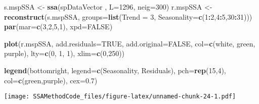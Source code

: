 \documentclass[
]{article}
\newenvironment{Shaded}{\begin{snugshade}}{\end{snugshade}}
\newcommand{\AttributeTok}[1]{\textcolor[rgb]{0.13,0.29,0.53}{#1}}
\newcommand{\ConstantTok}[1]{\textcolor[rgb]{0.56,0.35,0.01}{#1}}
\newcommand{\DecValTok}[1]{\textcolor[rgb]{0.00,0.00,0.81}{#1}}
\newcommand{\FloatTok}[1]{\textcolor[rgb]{0.00,0.00,0.81}{#1}}
\newcommand{\FunctionTok}[1]{\textcolor[rgb]{0.13,0.29,0.53}{\textbf{#1}}}
\newcommand{\NormalTok}[1]{#1}
\newcommand{\OtherTok}[1]{\textcolor[rgb]{0.56,0.35,0.01}{#1}}
\newcommand{\SpecialCharTok}[1]{\textcolor[rgb]{0.81,0.36,0.00}{\textbf{#1}}}
\newcommand{\StringTok}[1]{\textcolor[rgb]{0.31,0.60,0.02}{#1}}
\begin{document}
\begin{Shaded}
\begin{Highlighting}[]
\NormalTok{s.mspSSA }\OtherTok{\textless{}{-}} \FunctionTok{ssa}\NormalTok{(spDataVector , }\AttributeTok{L=}\DecValTok{1296}\NormalTok{, }\AttributeTok{neig=}\DecValTok{300}\NormalTok{)}
\NormalTok{r.mspSSA }\OtherTok{\textless{}{-}} \FunctionTok{reconstruct}\NormalTok{(s.mspSSA, }\AttributeTok{groups=}\FunctionTok{list}\NormalTok{(}\AttributeTok{Trend =} \DecValTok{3}\NormalTok{, }\AttributeTok{Seasonality=}\FunctionTok{c}\NormalTok{(}\DecValTok{1}\SpecialCharTok{:}\DecValTok{2}\NormalTok{,}\DecValTok{4}\SpecialCharTok{:}\DecValTok{5}\NormalTok{,}\DecValTok{30}\SpecialCharTok{:}\DecValTok{31}\NormalTok{)))}
\FunctionTok{par}\NormalTok{(}\AttributeTok{mar=}\FunctionTok{c}\NormalTok{(}\DecValTok{3}\NormalTok{,}\DecValTok{2}\NormalTok{,}\DecValTok{5}\NormalTok{,}\DecValTok{1}\NormalTok{), }\AttributeTok{xpd=}\ConstantTok{FALSE}\NormalTok{)}

\FunctionTok{plot}\NormalTok{(r.mspSSA, }\AttributeTok{add.residuals=}\ConstantTok{TRUE}\NormalTok{, }\AttributeTok{add.original=}\ConstantTok{FALSE}\NormalTok{, }\AttributeTok{col=}\FunctionTok{c}\NormalTok{(}\StringTok{\textquotesingle{}white\textquotesingle{}}\NormalTok{, }\StringTok{\textquotesingle{}green\textquotesingle{}}\NormalTok{, }\StringTok{\textquotesingle{}purple\textquotesingle{}}\NormalTok{), }\AttributeTok{lty=}\FunctionTok{c}\NormalTok{(}\DecValTok{0}\NormalTok{, }\DecValTok{1}\NormalTok{, }\DecValTok{1}\NormalTok{), }\AttributeTok{xlim=}\FunctionTok{c}\NormalTok{(}\DecValTok{0}\NormalTok{,}\DecValTok{250}\NormalTok{))}

\FunctionTok{legend}\NormalTok{(}\StringTok{\textquotesingle{}bottomright\textquotesingle{}}\NormalTok{, }\AttributeTok{legend=}\FunctionTok{c}\NormalTok{(}\StringTok{\textquotesingle{}Seasonality\textquotesingle{}}\NormalTok{, }\StringTok{\textquotesingle{}Residuals\textquotesingle{}}\NormalTok{), }\AttributeTok{pch=}\FunctionTok{rep}\NormalTok{(}\DecValTok{15}\NormalTok{,}\DecValTok{4}\NormalTok{), }\AttributeTok{col=}\FunctionTok{c}\NormalTok{(}\StringTok{\textquotesingle{}green\textquotesingle{}}\NormalTok{,}\StringTok{\textquotesingle{}purple\textquotesingle{}}\NormalTok{), }\AttributeTok{cex=}\FloatTok{0.7}\NormalTok{)}
\end{Highlighting}
\end{Shaded}

\texttt{[image: SSAMethodCode\_files/figure-latex/unnamed-chunk-24-1.pdf]}
\end{document}
